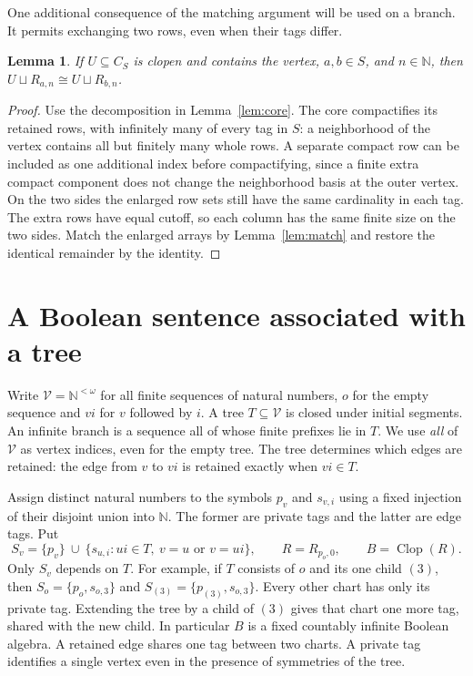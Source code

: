 \documentclass[11pt,letterpaper]{article}
\newtheorem{lemma}[theorem]{Lemma}
\theoremstyle{definition}\newtheorem{definition}[theorem]{Definition}
\newcommand{\N}{\mathbb N}
\newcommand{\Clop}{\operatorname{Clop}}
\begin{document}
One additional consequence of the matching argument will be used on a
branch. It permits exchanging two rows, even when their tags differ.

\begin{lemma}\label{lem:exchange}
If \(U\subseteq C_S\) is clopen and contains the vertex, \(a,b\in S\),
and \(n\in\N\), then \(U\sqcup R_{a,n}\cong U\sqcup R_{b,n}\).
\end{lemma}
\begin{proof}
Use the decomposition in Lemma~\ref{lem:core}. The core compactifies its
retained rows, with infinitely many of every tag in \(S\): a neighborhood
of the vertex contains all but finitely many whole rows. A separate
compact row can be included as one additional index before compactifying,
since a finite extra compact component does not change the neighborhood
basis at the outer vertex. On the two sides the enlarged row sets still
have the same cardinality in each tag. The extra rows have equal cutoff,
so each column has the same finite size on the two sides. Match the
enlarged arrays by Lemma~\ref{lem:match} and restore the identical
remainder by the identity.
\end{proof}
\section{A Boolean sentence associated with a tree}\label{sec:guard}
Write \(\mathcal V=\N^{<\omega}\) for all finite sequences of natural
numbers, \(o\) for the empty sequence and \(vi\) for \(v\) followed by
\(i\). A tree \(T\subseteq\mathcal V\) is closed under initial segments.
An infinite branch is a sequence all of whose finite prefixes lie in \(T\).
We use \emph{all} of \(\mathcal V\) as vertex indices, even for the empty
tree. The tree determines which edges are retained: the edge from \(v\) to
\(vi\) is retained exactly when \(vi\in T\).

Assign distinct natural numbers to the symbols \(p_v\) and \(s_{v,i}\)
using a fixed injection of their disjoint union into \(\N\).
The former are private tags and the latter are edge tags. Put
\[
 S_v=\{p_v\}\ \cup\
 \{s_{u,i}:ui\in T,\ v=u\text{ or }v=ui\},\qquad
 R=R_{p_o,0},\qquad B=\Clop(R).
\]
Only \(S_v\) depends on \(T\). For example, if \(T\) consists of \(o\)
and its one child \((3)\), then \(S_o=\{p_o,s_{o,3}\}\) and
\(S_{(3)}=\{p_{(3)},s_{o,3}\}\). Every other chart has only its private
tag. Extending the tree by a child of \((3)\) gives that chart one more
tag, shared with the new child. In particular \(B\) is a fixed countably
infinite Boolean algebra. A retained edge shares one tag between two charts.
A private tag identifies a single vertex even in the presence of symmetries
of the tree.
\end{document}
